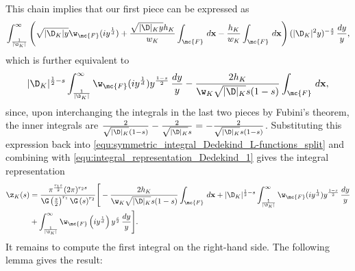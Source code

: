       This chain implies that our first piece can be expressed as
      \[
        \int_{\frac{1}{|\D_{K}|}}^{\infty}\left(\sqrt{|\D_{K}|y}\w_{\mc{F}}(iy^{\frac{1}{d}})+\frac{\sqrt{|\D|_{K}y}h_{K}}{w_{K}}\int_{\mc{F}}\,d\mathbf{x}-\frac{h_{K}}{w_{K}}\int_{\mc{F}}\,d\mathbf{x}\right)(|\D_{K}|^{2}y)^{-\frac{s}{2}}\,\frac{dy}{y},
      \]
      which is further equivalent to
      \[
        |\D_{K}|^{\frac{1}{2}-s}\int_{\frac{1}{|\D_{K}|}}^{\infty}\w_{\mc{F}}(iy^{\frac{1}{d}})y^{\frac{1-s}{2}}\,\frac{dy}{y}-\frac{2h_{K}}{\w_{K}\sqrt{|\D|_{K}}s(1-s)}\int_{\mc{F}}\,d\mathbf{x},
      \]
      since, upon interchanging the integrals in the last two pieces by Fubini's theorem, the inner integrals are $\frac{2}{\sqrt{|\D|_{K}}(1-s)}-\frac{2}{\sqrt{|\D|_{K}}s} = -\frac{2}{\sqrt{|\D|_{K}}s(1-s)}$. Substituting this expression back into \cref{equ:symmetric_integral_Dedekind_L-functions_split} and combining with \cref{equ:integral_representation_Dedekind_1} gives the integral representation
      \begin{align*}
        \z_{K}(s) &= \frac{\pi^{\frac{r_{1}s}{2}}(2\pi)^{r_{2}s}}{\G\left(\frac{s}{2}\right)^{r_{1}}\G\left(s\right)^{r_{2}}}\Bigg[-\frac{2h_{K}}{\w_{K}\sqrt{|\D|_{K}}s(1-s)}\int_{\mc{F}}\,d\mathbf{x}+|\D_{K}|^{\frac{1}{2}-s}\int_{\frac{1}{|\D_{K}|}}^{\infty}\w_{\mc{F}}(iy^{\frac{1}{d}})y^{\frac{1-s}{2}}\,\frac{dy}{y} \\
        &+ \int_{\frac{1}{|\D_{K}|}}^{\infty}\w_{\mc{F}}\left(iy^{\frac{1}{d}}\right)y^{\frac{s}{2}}\,\frac{dy}{y}\Bigg].
      \end{align*}
      It remains to compute the first integral on the right-hand side. The following lemma gives the result:

